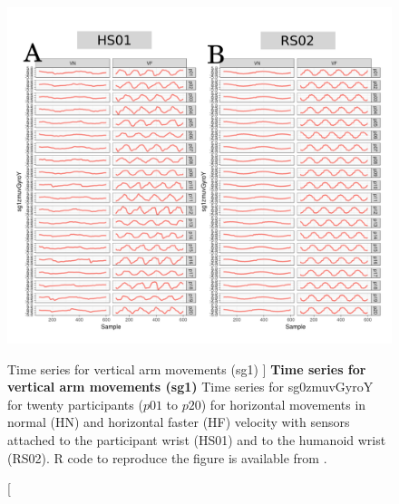 \begin{figure}
\centering
\includegraphics[width=1.0\textwidth]{aV-sg1}
    	\caption
	[Time series for vertical arm movements (sg1) ]{
	{\bf Time series for vertical arm movements (sg1)}
		Time series for sg0zmuvGyroY for twenty participants 
		($p01$ to  $p20$) 
		for horizontal movements in normal (HN) and horizontal faster (HF) 
		velocity with sensors attached to the participant wrist (HS01)
		and to the humanoid wrist (RS02).
	R code to reproduce the figure is available from \cite{xochicale2018}.
        }
    \label{fig:aV-sg1}
\end{figure}

